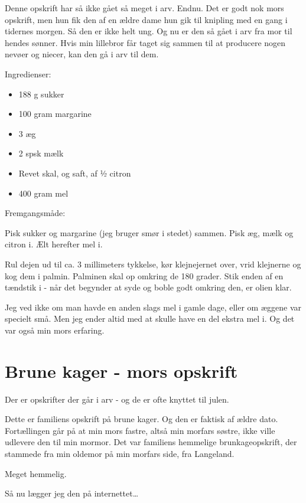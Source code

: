 \documentclass[
]{book}
\providecommand{\tightlist}{%
  \setlength{\itemsep}{0pt}\setlength{\parskip}{0pt}}
\begin{document}
Denne opskrift har så ikke gået så meget i arv. Endnu. Det er godt nok mors opskrift, men hun fik den af en ældre dame hun gik til knipling med en gang i tidernes morgen. Så den er ikke helt ung. Og nu er den så gået i arv fra mor til hendes sønner. Hvis min lillebror får taget sig sammen til at producere nogen nevøer og niecer, kan den gå i arv til dem.

Ingredienser:

\begin{itemize}
\tightlist
\item
  188 g sukker
\item
  100 gram margarine
\item
  3 æg
\item
  2 spsk mælk
\item
  Revet skal, og saft, af ½ citron
\item
  400 gram mel
\end{itemize}

Fremgangsmåde:

Pisk sukker og margarine (jeg bruger smør i stedet) sammen.
Pisk æg, mælk og citron i.
Ælt herefter mel i.

Rul dejen ud til ca. 3 millimeters tykkelse, kør klejnejernet over, vrid klejnerne og kog dem i palmin. Palminen skal op omkring de 180 grader. Stik enden af en tændstik i - når det begynder at syde og boble godt omkring den, er olien klar.

Jeg ved ikke om man havde en anden slags mel i gamle dage, eller om æggene var specielt små. Men jeg ender altid med at skulle have en del ekstra mel i. Og det var også min mors erfaring.

\hypertarget{brune-kager---mors-opskrift}{%
\section{Brune kager - mors opskrift}\label{brune-kager---mors-opskrift}}

Der er opskrifter der går i arv - og de er ofte knyttet til julen.

Dette er familiens opskrift på brune kager. Og den er faktisk af ældre dato. Fortællingen går på at min mors fastre, altså min morfars søstre, ikke ville udlevere den til min mormor. Det var familiens hemmelige brunkageopskrift, der stammede fra min oldemor på min morfars side, fra Langeland.

Meget hemmelig.

Så nu lægger jeg den på internettet\ldots{}
\end{document}
